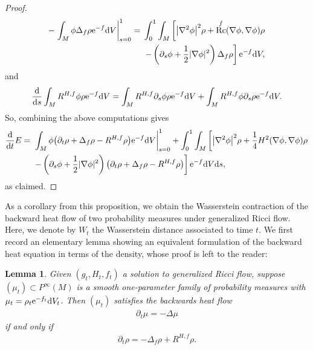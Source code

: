 \documentclass[pdftex]{sigma}
\numberwithin{equation}{section}
\newtheorem{Lemma}[thm]{Lemma}
\newcommand{\del}{\partial}
\newcommand{\N}{\nabla}
\DeclareMathOperator{\Rc}{Rc}
\begin{document}
\begin{proof}
\begin{align*}
 -\left.\int_M \phi\Delta_f\rho {\rm e}^{-f} {\rm d}V\right|_{s=0}^1
 ={}&\int_0^1\int_M \left[ \big|\N^2\phi\big|^2 \rho +\Rc^f(\N\phi,\N\phi)\rho\right. \\
 &\left.- \left(\del_s\phi+ \frac12|\N\phi|^2\right)\Delta_f\rho \right] {\rm e}^{-f} {\rm d}V,
 \end{align*}
 and
 \begin{align*}
 \frac{{\rm d}}{{\rm d}s}\int_M R^{H,f}\phi\rho {\rm e}^{-f} {\rm d}V=\int_M R^{H,f}\del_s\phi\rho {\rm e}^{-f} {\rm d}V+\int_M R^{H,f}\phi\del_s\rho {\rm e}^{-f} {\rm d}V.
 \end{align*}
 So, combining the above computations gives
 \begin{align*}
 \frac{{\rm d}}{{\rm d}t} E
={}&\left. \int_M \phi\big(\del_t\rho+\Delta_f \rho-R^{H,f}\rho\big) {\rm e}^{-f} {\rm d}V\right|_{s=0}^1+\int_0^1\int_M\left[ \big|\N^2\phi\big|^2\rho+\frac14 H^2(\N\phi,\N\phi)\rho\right.\\
 &\left.-\left(\del_s\phi+\frac12|\N\phi|^2\right)\big(\del_t\rho+\Delta_f\rho-R^{H,f}\rho\big) \right] {\rm e}^{-f} {\rm d}V {\rm d}s,
 \end{align*}
 as claimed.
\end{proof}

As a corollary from this proposition, we obtain the Wasserstein contraction of the backward heat flow of two probability measures under generalized Ricci flow. Here, we denote by $W_t$ the Wasserstein distance associated to time $t$. We first record an elementary lemma showing an equivalent formulation of the backward heat equation in terms of the density, whose proof is left to the reader:

\begin{Lemma} \label{l:rhoBHE} Given $(g_t, H_t, f_t)$ a solution to generalized Ricci flow, suppose $(\mu_t)\subset P^\infty(M)$ is a smooth one-parameter family of probability measures with $\mu_t = \rho_t {\rm e}^{-f_t} {\rm d}V_t$. Then $(\mu_t)$ satisfies the backwards heat flow
\begin{align}\label{eq: heatmeasure}
 \del_t\mu=-\Delta \mu
\end{align}
if and only if
\begin{align}\label{eq: heatdensity}
 \del_t\rho=-\Delta_f\rho + R^{H,f} \rho.
\end{align}
\end{Lemma}
\end{document}
